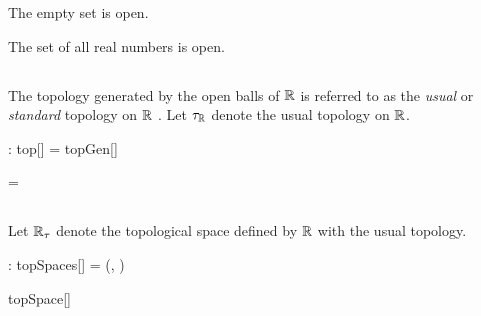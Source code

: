 \documentclass[11pt, oneside]{article}
\begin{document}
\begin{remark}
The empty set is open.

\begin{zed}
	\emptyset \in \openR
\end{zed}

\end{remark}

\begin{remark}
The set of all real numbers is open.

\begin{zed}
	\R \in \openR
\end{zed}

\end{remark}

\subsection{}

The topology generated by the open balls of $\mathbb{R}$ is referred to as the {\it usual} or {\it standard} topology on $\mathbb{R}$ .
Let $\tau_{\mathbb{R}}$ denote the usual topology on $\mathbb{R}$.

\begin{axdef}
	\tauR: top[\R]
\where
	\tauR = topGen[\R] \ballsR
\end{axdef}

\begin{remark}

\begin{zed}
	\tauR = \openR
\end{zed}

\end{remark}

\subsection{}

Let $\mathbb{R}_\tau$ denote the topological space defined by $\mathbb{R}$ with the usual topology.

\begin{axdef}
	\Rtau: topSpaces[\R]
\where
	\Rtau = (\R, \tauR)
\end{axdef}

\begin{example}

\begin{zed}
	\Rtau \in topSpace[\R]
\end{zed}

\end{example}
\end{document}
